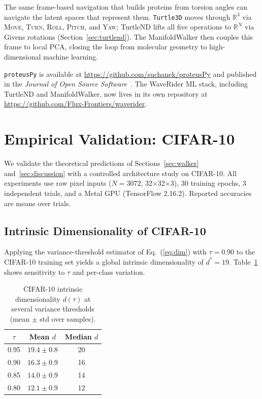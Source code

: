 \documentclass[11pt,letterpaper]{article}
\begin{document}
The same frame-based navigation that builds proteins from torsion angles
can navigate the latent spaces that represent them.  \texttt{Turtle3D}
moves through $\mathbb{R}^3$ via \textsc{Move}, \textsc{Turn},
\textsc{Roll}, \textsc{Pitch}, and \textsc{Yaw}; TurtleND lifts all five
operations to $\mathbb{R}^N$ via Givens rotations (Section~\ref{sec:turtlend}).
The ManifoldWalker then couples this frame to local PCA, closing the loop
from molecular geometry to high-dimensional machine learning.

\texttt{proteusPy} is available at
\url{https://github.com/suchanek/proteusPy} and published in the
\textit{Journal of Open Source Software}~\cite{suchanek2024proteuspyjoss}.
The WaveRider ML stack, including TurtleND and ManifoldWalker, now lives in
its own repository at \url{https://github.com/Flux-Frontiers/waverider}.

\section{Empirical Validation: CIFAR-10}
\label{sec:empirical}

We validate the theoretical predictions of Sections~\ref{sec:walker}
and~\ref{sec:discussion} with a controlled architecture study on CIFAR-10.
All experiments use raw pixel inputs ($N = 3072$, 32$\times$32$\times$3),
30 training epochs, 3 independent trials, and a Metal GPU (TensorFlow 2.16.2).
Reported accuracies are means over trials.

\subsection{Intrinsic Dimensionality of CIFAR-10}

Applying the variance-threshold estimator of Eq.~(\ref{eq:dim}) with
$\tau = 0.90$ to the CIFAR-10 training set yields a global intrinsic
dimensionality of $d^* = 19$.  Table~\ref{tab:cifar10_dim} shows
sensitivity to $\tau$ and per-class variation.

\begin{table}[h]
\centering
\caption{CIFAR-10 intrinsic dimensionality $d(\tau)$ at several variance
  thresholds (mean $\pm$ std over samples).}
\label{tab:cifar10_dim}
\begin{tabular}{@{}ccc@{}}
\toprule
$\tau$ & Mean $d$ & Median $d$ \\
\midrule
0.95 & $19.4 \pm 0.8$ & 20 \\
0.90 & $16.3 \pm 0.9$ & 16 \\
0.85 & $14.0 \pm 0.9$ & 14 \\
0.80 & $12.1 \pm 0.9$ & 12 \\
\bottomrule
\end{tabular}
\end{table}
\end{document}
